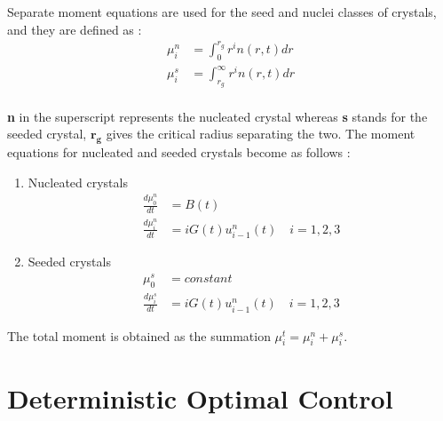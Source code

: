 \documentclass[3p,times]{elsarticle}
\begin{document}
Separate moment equations are used for the seed and nuclei classes of crystals, and they are defined as : \\
\begin{align}
\mu^{n}_{i} &= \int_{0}^{r_{g}} r^{i}n(r,t) dr \\
\mu^{s}_{i} &= \int_{r_{g}}^{\infty} r^{i}n(r,t) dr
\end{align} \\
\textbf{n} in the superscript represents the nucleated crystal whereas \textbf{s} stands for the seeded crystal, $\boldsymbol{r_{g}}$ gives the critical radius separating the two. The moment equations for nucleated and seeded crystals become as follows\cite{yenkie} :

\begin{enumerate}

\item Nucleated crystals\cite{hu,paeng} 
\begin{align}
\frac{d\mu_{0}^{n}}{dt} &= B(t) \\
\frac{d\mu_{i}^{n}}{dt} &= iG(t)u_{i-1}^{n}(t) \quad  i = 1,2,3
\end{align}

\item Seeded crystals\cite{hu,paeng}
\begin{align}
\mu_{0}^{s} &= constant \\ \label{seed}
\frac{d\mu_{i}^{s}}{dt} &= iG(t)u_{i-1}^{n}(t) \quad  i = 1,2,3 
\end{align}
\end{enumerate}
The total moment is obtained as the summation $\mu_{i}^{t} = \mu_{i}^{n} + \mu_{i}^{s}$. 



\section{Deterministic Optimal Control}
\end{document}
